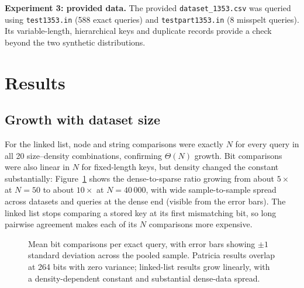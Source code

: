 \documentclass[10pt]{article}
\begin{document}
\textbf{Experiment 3: provided data.}
The provided \texttt{dataset\_1353.csv} was queried using \texttt{test1353.in} (588 exact
queries) and \texttt{testpart1353.in} (8 misspelt queries). Its variable-length,
hierarchical keys and duplicate records provide a check beyond the two synthetic
distributions.

\section{Results}

\subsection{Growth with dataset size}
\label{sec:growth}

For the linked list, node and string comparisons were exactly $N$ for every query in all
20 size--density combinations, confirming $\Theta(N)$ growth. Bit comparisons were also
linear in $N$ for fixed-length keys, but density changed the constant substantially:
Figure~\ref{fig:llbit} shows the dense-to-sparse ratio growing from about $5\times$ at
$N=50$ to about $10\times$ at $N=40\,000$, with wide sample-to-sample spread across
datasets and queries at the dense end (visible from the error bars). The linked list
stops comparing a stored key at
its first mismatching bit, so long pairwise agreement makes each of its $N$ comparisons
more expensive.

\begin{figure}[h]
\centering
{}
\caption{Mean bit comparisons per exact query, with error bars showing $\pm 1$ standard
deviation across the pooled sample. Patricia results overlap at 264 bits with zero
variance; linked-list results grow linearly, with a density-dependent constant and
substantial dense-data spread.}
\label{fig:llbit}
\end{figure}
\end{document}
